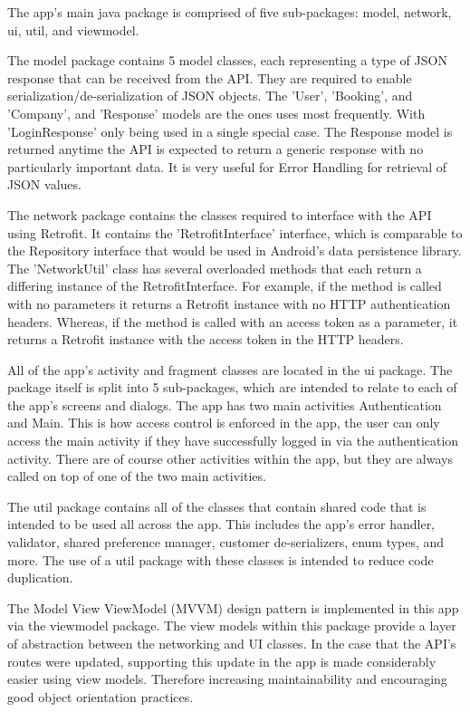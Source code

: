The app's main java package is comprised of five sub-packages: model, network, ui, util, and viewmodel.

The model package contains 5 model classes, each representing a type of JSON response that can be received from the API. They are required to enable serialization/de-serialization of JSON objects. The 'User', 'Booking', and 'Company', and 'Response' models are the ones uses most frequently. With 'LoginResponse' only being used in a single special case. The Response model is returned anytime the API is expected to return a generic response with no particularly important data. It is very useful for Error Handling for retrieval of JSON values.

The network package contains the classes required to interface with the API using Retrofit. It contains the 'RetrofitInterface' interface, which is comparable to the Repository interface that would be used in Android's data persistence library. The 'NetworkUtil' class has several overloaded methods that each return a differing instance of the RetrofitInterface. For example, if the method is called with no parameters it returns a Retrofit instance with no HTTP authentication headers. Whereas, if the method is called with an access token as a parameter, it returns a Retrofit instance with the access token in the HTTP headers.

All of the app's activity and fragment classes are located in the ui package. The package itself is split into 5 sub-packages, which are intended to relate to each of the app's screens and dialogs. The app has two main activities Authentication and Main. This is how access control is enforced in the app, the user can only access the main activity if they have successfully logged in via the authentication activity. There are of course other activities within the app, but they are always called on top of one of the two main activities.

The util package contains all of the classes that contain shared code that is intended to be used all across the app. This includes the app's error handler, validator, shared preference manager, customer de-serializers, enum types, and more. The use of a util package with these classes is intended to reduce code duplication.

The Model View ViewModel (MVVM) design pattern is implemented in this app via the viewmodel package. The view models within this package provide a layer of abstraction between the networking and UI classes. In the case that the API's routes were updated, supporting this update in the app is made considerably easier using view models. Therefore increasing maintainability and encouraging good object orientation practices.

